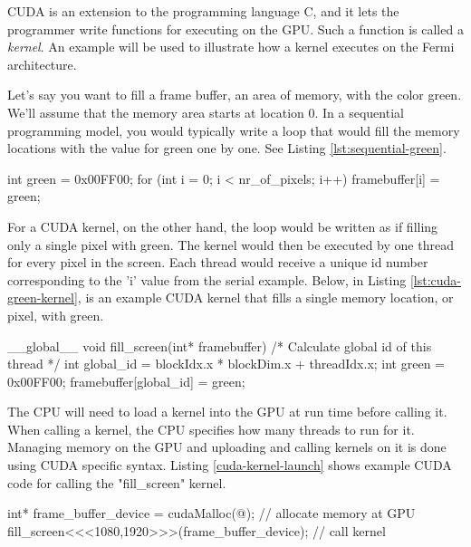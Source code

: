 \documentclass[../main/report.tex]{subfiles}
\begin{document}
CUDA is an extension to the programming language C, and it lets the programmer write functions for executing on the GPU.
Such a function is called a \emph{kernel}.
An example will be used to illustrate how a kernel executes on the Fermi architecture.

Let's say you want to fill a frame buffer, an area of memory, with the color green.
We'll assume that the memory area starts at location 0.
In a sequential programming model, you would typically write a loop that would fill
the memory locations with the value for green one by one.
See Listing \ref{lst:sequential-green}.

\begin{c-code}[caption=A sequential program filling the screen with green, label=lst:sequential-green]
int green = 0x00FF00;
for (int i = 0; i < nr_of_pixels; i++){
	framebuffer[i] = green;
}
\end{c-code}

For a CUDA kernel, on the other hand, the loop would be written as if filling only a single pixel with green. 
The kernel would then be executed by one thread for every pixel in the screen.
Each thread would receive a unique id number corresponding to the 'i' value from the serial example.
Below, in Listing \ref{lst:cuda-green-kernel}, is an example CUDA kernel that fills a single memory location, or pixel, with green.

\begin{c-code}[caption=A CUDA kernel filling a single pixel with green, label=lst:cuda-green-kernel]
__global__ void fill_screen(int* framebuffer){
	/* Calculate global id of this thread */
	int global_id = blockIdx.x * blockDim.x + threadIdx.x; 
	int green     = 0x00FF00;
	framebuffer[global_id] = green;
}
\end{c-code}

The CPU will need to load a kernel into the GPU at run time before calling it.
When calling a kernel, the CPU specifies how many threads to run for it.
Managing memory on the GPU and uploading and calling kernels on it is done using CUDA specific syntax.
Listing \ref{cuda-kernel-launch} shows example CUDA code for calling the "fill\_screen" kernel.

\begin{c-code}[caption=Starting the CUDA kernel with one thread per pixel on a 1920x1080 screen, label=cuda-kernel-launch]
int* frame_buffer_device = cudaMalloc(@); // allocate memory at GPU
fill_screen<<<1080,1920>>>(frame_buffer_device); // call kernel
\end{c-code}
\end{document}
